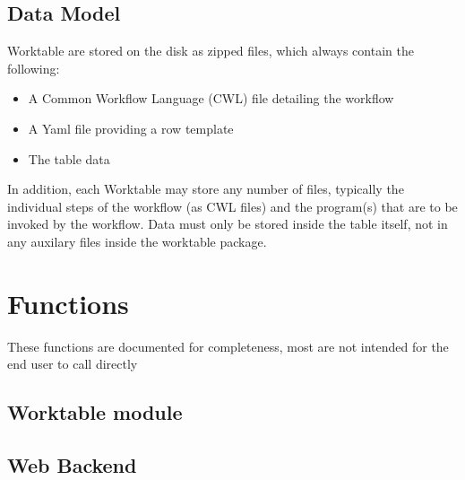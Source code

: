 \documentclass[letterpaper,10pt,english]{sphinxmanual}
\begin{document}
\section{Data Model}
\label{\detokenize{design:data-model}}
Worktable are stored on the disk as zipped files, which always contain the following:
\begin{itemize}
\item {} 
A Common Workflow Language (CWL) file detailing the workflow

\item {} 
A Yaml file providing a row template

\item {} 
The table data

\end{itemize}

In addition, each Worktable may store any number of files, typically the individual steps of the workflow (as CWL files) and the program(s) that are to be invoked by the workflow. Data must only be stored inside the table itself, not in any auxilary files inside the worktable package.


\chapter{Functions}
\label{\detokenize{funcs:functions}}\label{\detokenize{funcs::doc}}
These functions are documented for completeness, most are not intended
for the end user to call directly


\section{Worktable module}
\label{\detokenize{funcs:module-worktable}}\label{\detokenize{funcs:worktable-module}}

\section{Web Backend}
\label{\detokenize{funcs:module-backend}}\label{\detokenize{funcs:web-backend}}

\begin{fulllineitems}
\label{\detokenize{funcs:backend.ConeSearchHandler}}
\end{fulllineitems}
\end{document}
